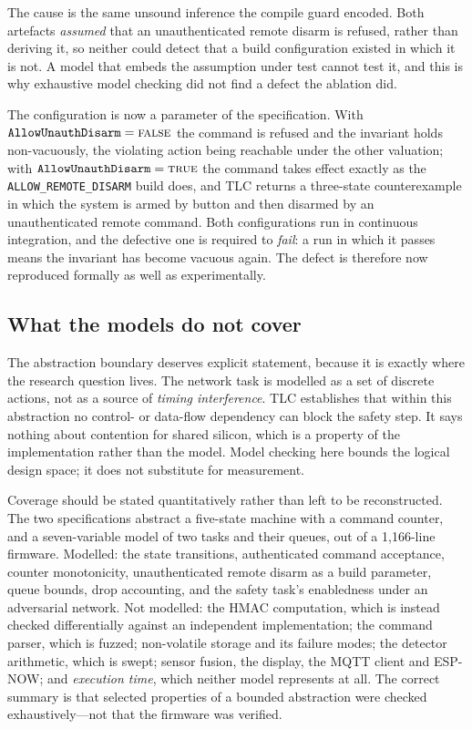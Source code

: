 The cause is the same unsound inference the compile guard encoded. Both artefacts
\emph{assumed} that an unauthenticated remote disarm is refused, rather than deriving it, so
neither could detect that a build configuration existed in which it is not. A model that
embeds the assumption under test cannot test it, and this is why exhaustive model checking did
not find a defect the ablation did.

The configuration is now a parameter of the specification. With
$\texttt{AllowUnauthDisarm} = \textsc{false}$ the command is refused and the invariant holds
non-vacuously, the violating action being reachable under the other valuation; with
$\texttt{AllowUnauthDisarm} = \textsc{true}$ the command takes effect exactly as the
\texttt{ALLOW\_REMOTE\_DISARM} build does, and TLC returns a three-state counterexample in which
the system is armed by button and then disarmed by an unauthenticated remote command. Both
configurations run in continuous integration, and the defective one is required to \emph{fail}:
a run in which it passes means the invariant has become vacuous again. The defect is therefore
now reproduced formally as well as experimentally.

\subsection{What the models do not cover}

The abstraction boundary deserves explicit statement, because it is exactly where the research
question lives. The network task is modelled as a set of discrete actions, not as a source of
\emph{timing interference}. TLC establishes that within this abstraction no control- or data-flow
dependency can block the safety step. It says nothing about contention for shared silicon, which
is a property of the implementation rather than the model. Model checking here bounds the logical
design space; it does not substitute for measurement.

Coverage should be stated quantitatively rather than left to be reconstructed. The two
specifications abstract a five-state machine with a command counter, and a seven-variable model of
two tasks and their queues, out of a 1{,}166-line firmware. Modelled: the state transitions,
authenticated command acceptance, counter monotonicity, unauthenticated remote disarm as a build
parameter, queue bounds, drop accounting, and the safety task's enabledness under an adversarial
network. Not modelled: the HMAC computation, which is instead checked differentially against an
independent implementation; the command parser, which is fuzzed; non-volatile storage and its
failure modes; the detector arithmetic, which is swept; sensor fusion, the display, the MQTT client
and ESP-NOW; and \emph{execution time}, which neither model represents at all. The correct summary
is that selected properties of a bounded abstraction were checked exhaustively---not that the
firmware was verified.

